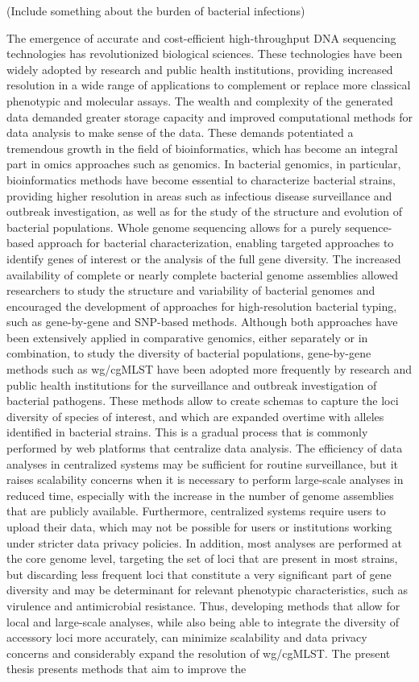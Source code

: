 
(Include something about the burden of bacterial infections)

The emergence of accurate and cost-efficient high-throughput DNA sequencing technologies has revolutionized biological sciences. These technologies have been widely adopted by research and public health institutions, providing increased resolution in a wide range of applications to complement or replace more classical phenotypic and molecular assays. The wealth and complexity of the generated data demanded greater storage capacity and improved computational methods for data analysis to make sense of the data. These demands potentiated a tremendous growth in the field of bioinformatics, which has become an integral part in omics approaches such as genomics. In bacterial genomics, in particular, bioinformatics methods have become essential to characterize bacterial strains, providing higher resolution in areas such as infectious disease surveillance and outbreak investigation, as well as for the study of the structure and evolution of bacterial populations. Whole genome sequencing allows for a purely sequence-based approach for bacterial characterization, enabling targeted approaches to identify genes of interest or the analysis of the full gene diversity. The increased availability of complete or nearly complete bacterial genome assemblies allowed researchers to study the structure and variability of bacterial genomes and encouraged the development of approaches for high-resolution bacterial typing, such as gene-by-gene and SNP-based methods. Although both approaches have been extensively applied in comparative genomics, either separately or in combination, to study the diversity of bacterial populations, gene-by-gene methods such as wg/cgMLST have been adopted more frequently by research and public health institutions for the surveillance and outbreak investigation of bacterial pathogens. These methods allow to create schemas to capture the loci diversity of species of interest, and which are expanded overtime with alleles identified in bacterial strains. This is a gradual process that is commonly performed by web platforms that centralize data analysis. The efficiency of data analyses in centralized systems may be sufficient for routine surveillance, but it raises scalability concerns when it is necessary to perform large-scale analyses in reduced time, especially with the increase in the number of genome assemblies that are publicly available. Furthermore, centralized systems require users to upload their data, which may not be possible for users or institutions working under stricter data privacy policies. In addition, most analyses are performed at the core genome level, targeting the set of loci that are present in most strains, but discarding less frequent loci that constitute a very significant part of gene diversity and may be determinant for relevant phenotypic characteristics, such as virulence and antimicrobial resistance. Thus, developing methods that allow for local and large-scale analyses, while also being able to integrate the diversity of accessory loci more accurately, can minimize scalability and data privacy concerns and considerably expand the resolution of wg/cgMLST. The present thesis presents methods that aim to improve the 